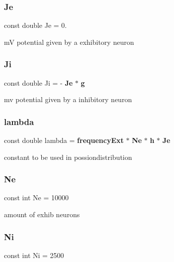 \subsubsection{Je}
{\footnotesize\ttfamily const double Je = 0.}



mV potential given by a exhibitory neuron 

\mbox{\label{constants_8h_ac96467d7ddc139a268b00c766205fd04}} 
\subsubsection{Ji}
{\footnotesize\ttfamily const double Ji = -\/\textbf{ Je} $\ast$ \textbf{ g}}



mv potential given by a inhibitory neuron 

\mbox{\label{constants_8h_a01c828218289eff2af40b9cdf043393f}} 
\subsubsection{lambda}
{\footnotesize\ttfamily const double lambda = \textbf{ frequency\+Ext} $\ast$ \textbf{ Ne} $\ast$ \textbf{ h} $\ast$ \textbf{ Je}}



constant to be used in possiondistribution 

\mbox{\label{constants_8h_a78f078e19c99a6fc51a8bc2adb8acfa0}} 
\subsubsection{Ne}
{\footnotesize\ttfamily const int Ne = 10000}



amount of exhib neurons 

\mbox{\label{constants_8h_a7f259aefd534417d68d4587e7eaacc55}} 
\subsubsection{Ni}
{\footnotesize\ttfamily const int Ni = 2500}



